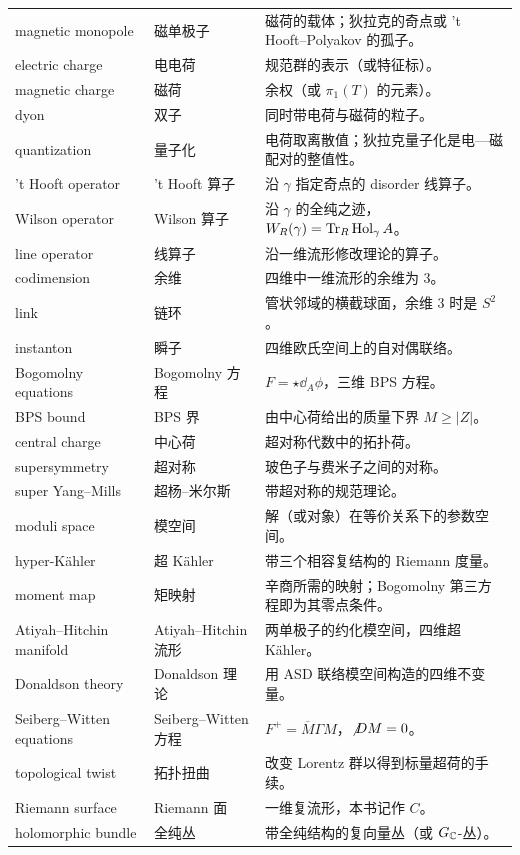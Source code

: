 {\begin{longtable}{@{}p{4.3cm}p{3.3cm}p{6.6cm}@{}}
magnetic monopole & 磁单极子 & 磁荷的载体；狄拉克的奇点或 't Hooft--Polyakov 的孤子。 \\
electric charge & 电电荷 & 规范群的表示（或特征标）。 \\
magnetic charge & 磁荷 & 余权（或 $\pi_1(T)$ 的元素）。 \\
dyon & 双子 & 同时带电荷与磁荷的粒子。 \\
quantization & 量子化 & 电荷取离散值；狄拉克量子化是电—磁配对的整值性。 \\
't Hooft operator & 't Hooft 算子 & 沿 $\gamma$ 指定奇点的 disorder 线算子。 \\
Wilson operator & Wilson 算子 & 沿 $\gamma$ 的全纯之迹，$W_R(\gamma)=\Tr_R\operatorname{Hol}_\gamma A$。 \\
line operator & 线算子 & 沿一维流形修改理论的算子。 \\
codimension & 余维 & 四维中一维流形的余维为 $3$。 \\
link & 链环 & 管状邻域的横截球面，余维 $3$ 时是 $S^2$。 \\
instanton & 瞬子 & 四维欧氏空间上的自对偶联络。 \\
Bogomolny equations & Bogomolny 方程 & $F=\star\dd_A\phi$，三维 BPS 方程。 \\
BPS bound & BPS 界 & 由中心荷给出的质量下界 $M\ge|Z|$。 \\
central charge & 中心荷 & 超对称代数中的拓扑荷。 \\
supersymmetry & 超对称 & 玻色子与费米子之间的对称。 \\
super Yang--Mills & 超杨--米尔斯 & 带超对称的规范理论。 \\
moduli space & 模空间 & 解（或对象）在等价关系下的参数空间。 \\
hyper-Kähler & 超 Kähler & 带三个相容复结构的 Riemann 度量。 \\
moment map & 矩映射 & 辛商所需的映射；Bogomolny 第三方程即为其零点条件。 \\
Atiyah--Hitchin manifold & Atiyah--Hitchin 流形 & 两单极子的约化模空间，四维超 Kähler。 \\
Donaldson theory & Donaldson 理论 & 用 ASD 联络模空间构造的四维不变量。 \\
Seiberg--Witten equations & Seiberg--Witten 方程 & $F^+=\overline M\Gamma M$，$\slashed{D}M=0$。 \\
topological twist & 拓扑扭曲 & 改变 Lorentz 群以得到标量超荷的手续。 \\
Riemann surface & Riemann 面 & 一维复流形，本书记作 $C$。 \\
holomorphic bundle & 全纯丛 & 带全纯结构的复向量丛（或 $G_\CC$-丛）。 \\

\end{longtable}}
